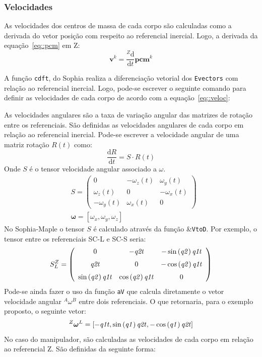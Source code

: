 \subsubsection{Velocidades}

As velocidades dos centros de massa de cada corpo são calculadas como a derivada
do vetor posição com respeito ao referencial inercial. Logo, a derivada da
equação~\ref{eq::pcm} em Z:
%
\begin{equation} \label{eq::veloc}
	\mathbf{v}^{k} = \frac{^{Z}\mathrm{d} }{\mathrm{d} t}
	\mathbf{pcm}^{k} 
\end{equation}
%

A função \texttt{cdft}, do Sophia realiza a diferenciação vetorial dos
\texttt{Evectors} com relação ao referencial inercial. Logo, pode-se escrever o
seguinte comando para definir as velocidades de cada corpo de acordo com a
equação~\ref{eq::veloc}:

\bigskip {} \bigskip 

As velocidades angulares são a taxa de variação angular das matrizes de rotação
entre os referenciais. São definidas as velocidades angulares de cada corpo em
relação ao referencial inercial. Pode-se escrever a velocidade angular de uma
matriz rotação $R(t)$ como:
%
\begin{equation} \label{eq::velang}
	\frac{\mathrm{d} R}{\mathrm{d} t} = S \cdot R(t)
\end{equation}
%
Onde $S$ é o tensor velocidade angular associado a $\omega$.
%
\begin{align}
& S = \begin{pmatrix}
0				& -\omega_{z}(t)	& \omega_{y}(t) \\ 
\omega_{z}(t)	& 0					& -\omega_{x}(t) \\ 
-\omega_{y}(t)	& \omega_{x}(t)		& 0
\end{pmatrix} \\
& \boldsymbol{\omega} = [\omega_{x}, \omega_{y}, \omega_{z}]
\end{align}
%
No Sophia-Maple o tensor $S$ é calculado através da função
\&\texttt{VtoD}. Por exemplo, o tensor entre os referenciais SC-L e SC-S seria:
%
$$
S_{L}^{Z} = \left( \begin {array}{ccc} 0&-{\it q2t}&-\sin \left( {\it q2}
 \right) {\it q1t}\\ \noalign{\medskip}{\it q2t}&0&-\cos \left( {\it 
q2} \right) {\it q1t}\\ \noalign{\medskip}\sin \left( {\it q2}
 \right) {\it q1t}&\cos \left( {\it q2} \right) {\it q1t}&0
\end {array} \right)
$$
%
Pode-se ainda fazer o uso da função \texttt{aV} que
calcula diretamente o vetor velocidade angular $^{A}\omega^{B}$ entre dois
referenciais. O que retornaria, para o exemplo proposto, o seguinte vetor:
%
$$
^{Z}\boldsymbol{\omega}^{L} = [-{\it q1t},\sin \left( {\it q1} \right) {\it q2t},-\cos
\left( {\it q1} \right) {\it q2t}]
$$
%
No caso do manipulador, são calculadas as velocidades de cada corpo em relação
ao referencial Z. São definidas da seguinte forma:

